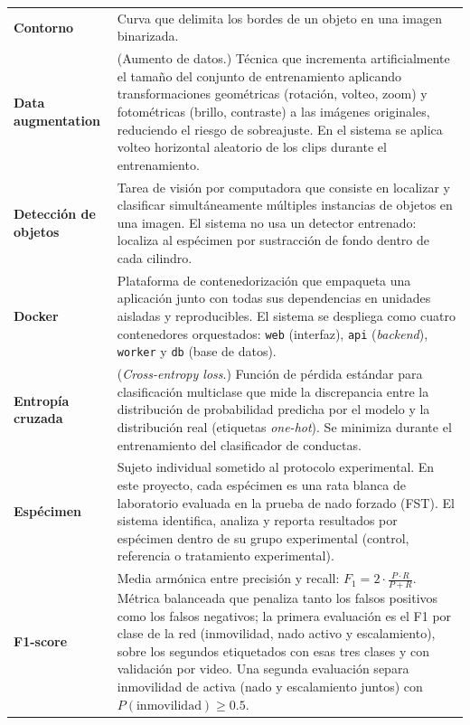 \begin{longtable}{@{} p{4.0cm} p{10.9cm} @{}}
  \textbf{Contorno}
  & Curva que delimita los bordes de un objeto en una imagen binarizada. \\[5pt]

  \textbf{Data augmentation}
  & (Aumento de datos.) Técnica que incrementa artificialmente el tamaño del
    conjunto de entrenamiento aplicando transformaciones geométricas (rotación,
    volteo, zoom) y fotométricas (brillo, contraste) a las imágenes originales,
    reduciendo el riesgo de sobreajuste. En el sistema se aplica volteo horizontal aleatorio de los clips durante el entrenamiento. \\[5pt]

  \textbf{Detección de objetos}
  & Tarea de visión por computadora que consiste en localizar y clasificar
    simultáneamente múltiples instancias de objetos en una imagen. El sistema no
    usa un detector entrenado: localiza al espécimen por sustracción de fondo
    dentro de cada cilindro. \\[5pt]

  \textbf{Docker}
  & Plataforma de contenedorización que empaqueta una aplicación junto con todas
    sus dependencias en unidades aisladas y reproducibles. El sistema se
    despliega como cuatro contenedores orquestados: \texttt{web} (interfaz), \texttt{api}
    (\textit{backend}), \texttt{worker} y \texttt{db} (base de datos). \\[5pt]

  \textbf{Entropía cruzada}
  & (\textit{Cross-entropy loss}.) Función de pérdida estándar para clasificación
    multiclase que mide la discrepancia entre la distribución de probabilidad
    predicha por el modelo y la distribución real (etiquetas \textit{one-hot}). Se
    minimiza durante el entrenamiento del clasificador de conductas. \\[5pt]

  \textbf{Espécimen}
  & Sujeto individual sometido al protocolo experimental. En este proyecto, cada
    espécimen es una rata blanca de laboratorio evaluada en la prueba de nado
    forzado (FST). El sistema identifica, analiza y reporta resultados por
    espécimen dentro de su grupo experimental (control, referencia o
    tratamiento experimental). \\[5pt]

  \textbf{F1-score}
  & Media armónica entre precisión y recall: $F_1 = 2 \cdot \frac{P \cdot R}{P + R}$.
    Métrica balanceada que penaliza tanto los falsos positivos como los falsos
    negativos; la primera evaluación es el F1 por clase de la red (inmovilidad, nado
    activo y escalamiento), sobre los segundos etiquetados con esas tres clases y con
    validación por video. Una segunda evaluación separa inmovilidad de activa (nado y
    escalamiento juntos) con $P(\text{inmovilidad}) \geq 0.5$. \\[5pt]


\end{longtable}
